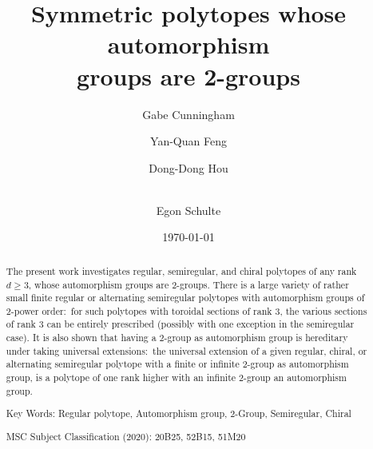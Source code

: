 \documentclass[12pt]{amsart}
\theoremstyle{definition}
\begin{document}
\title[Symmetric polytopes whose automorphism
groups are 2-groups]{Symmetric polytopes whose automorphism \\groups are 2-groups}

\author[G. Cunningham]{Gabe Cunningham}
\address{Gabe Cunningham, Applied Mathematics, School of Computing and Data Science, Wentworth Institute of Technology, Boston, MA 02115, USA}

\author[Y.-Q. Feng]{Yan-Quan Feng}
\address{Yan-Quan Feng, Department of Mathematics, Beijing Jiaotong University, Beijing, 100044, P.R. China}

\author[D.-D. Hou]{Dong-Dong Hou}
\address{Dong-Dong Hou, Shanxi Key Laboratory of Cryptography and Date Security, Department of Mathematics, Shanxi Normal University, Taiyuan, 100044, P.R. China}

\author[E. Schulte]{\\ Egon Schulte}
\address{Egon Schulte, Department of Mathematics, Northeastern University, Boston, MA, 02115, USA}

\date{ \today } 
\maketitle 

\begin{abstract}
The present work investigates regular, semiregular, and chiral polytopes of any rank $d\geq 3$, whose automorphism groups are 2-groups.  There is a large variety of rather small finite regular or  alternating semiregular polytopes with automorphism groups of 2-power order:\ for such polytopes with toroidal sections of rank 3, the various sections of rank $3$ can be entirely prescribed (possibly with one exception in the semiregular case). It is also shown that having a 2-group as automorphism group is hereditary under taking universal extensions:\ the universal extension of a given regular, chiral, or alternating semiregular polytope with a finite or infinite 2-group as automorphism group, is a polytope of one rank higher with an infinite 2-group an automorphism group. 
\bigskip\medskip

\noindent
Key Words:  Regular polytope, Automorphism group, 2-Group, Semiregular, Chiral
\medskip

\noindent
MSC Subject Classification (2020): 20B25, 52B15, 51M20
\end{abstract}
\end{document}
